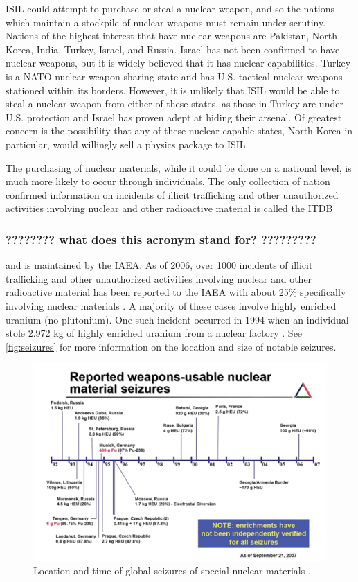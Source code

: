 \documentclass{report}
\begin{document}
ISIL could attempt to purchase or steal a nuclear weapon, and so the nations which maintain a stockpile of nuclear weapons must remain under scrutiny. Nations of the highest interest that have nuclear weapons are Pakistan, North Korea, India, Turkey, Israel, and Russia. Israel has not been confirmed to have nuclear weapons, but it is widely believed that it has nuclear capabilities. Turkey is a NATO nuclear weapon sharing state and has U.S. tactical nuclear weapons stationed within its borders. However, it is unlikely that ISIL would be able to steal a nuclear weapon from either of these states, as those in Turkey are under U.S. protection and Israel has proven adept at hiding their arsenal. Of greatest concern is the possibility that any of these nuclear-capable states, North Korea in particular, would willingly sell a physics package to ISIL.

The purchasing of nuclear materials, while it could be done on a national level, is much more likely to occur through individuals. The only collection of nation confirmed information on incidents of illicit trafficking and other unauthorized activities involving nuclear and other radioactive material is called the ITDB \subsubsection{???????? what does this acronym stand for?  ?????????} and is maintained by the IAEA. As of 2006, over 1000 incidents of illicit trafficking and other unauthorized activities involving nuclear and other radioactive material has been reported to the IAEA with about 25\% specifically involving nuclear materials \cite{Iaea2007}. A majority of these cases involve highly enriched uranium (no plutonium). One such incident occurred in 1994 when an individual stole 2.972 kg of highly enriched uranium from a nuclear factory \cite{Iaea2007}. See \autoref{fig:seizures} for more information on the location and size of notable seizures. 

\begin{figure}[h]
 \centering
 \includegraphics[trim = 0cm 0cm 0cm 0cm, clip,scale=0.7]{./figures/seizures.png}
   \caption{Location and time of global seizures of special nuclear materials \cite{Muller2007}.}
     \label{fig:seizures}
\end{figure}
\end{document}
